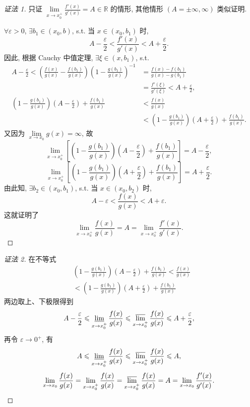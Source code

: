 \begin{proof}[证法 1]
只证 $\lim\limits_{x\to x_0^{+}}\frac{f'(x)}{g'(x)}=A\in\mathbb{R}$ 的情形, 其他情形 $(A=\pm\infty,\infty)$ 类似证明.

$\forall\varepsilon>0$, $\exists b_1\in(x_0,b)$, s.t. 当 $x\in(x_0,b_1)$ 时,
\[
A-\frac{\varepsilon}{2}<\frac{f'(x)}{g'(x)}<A+\frac{\varepsilon}{2}.
\]
因此, 根据 Cauchy 中值定理, $\exists\xi\in(x,b_1)$, s.t.
\[
\begin{aligned}
A-\frac{\varepsilon}{2}<\left(\frac{f(x)}{g(x)}-\frac{f(b_1)}{g(x)}\right)\left(1-\frac{g(b_1)}{g(x)}\right)^{-1}&=\frac{f(x)-f(b_1)}{g(x)-g(b_1)}\\
&=\frac{f'(\xi)}{g'(\xi)}<A+\frac{\varepsilon}{2},\\
\left(1-\frac{g(b_1)}{g(x)}\right)\left(A-\frac{\varepsilon}{2}\right)+\frac{f(b_1)}{g(x)}&<\frac{f(x)}{g(x)}\\
&<\left(1-\frac{g(b_1)}{g(x)}\right)\left(A+\frac{\varepsilon}{2}\right)+\frac{f(b_1)}{g(x)}.
\end{aligned}
\]
又因为 $\lim\limits_{x\to x_0}g(x)=\infty$, 故
\[
\lim_{x\to x_0^{+}}\left[\left(1-\frac{g(b_1)}{g(x)}\right)\left(A-\frac{\varepsilon}{2}\right)+\frac{f(b_1)}{g(x)}\right]=A-\frac{\varepsilon}{2},
\]
\[
\lim_{x\to x_0^{+}}\left[\left(1-\frac{g(b_1)}{g(x)}\right)\left(A+\frac{\varepsilon}{2}\right)+\frac{f(b_1)}{g(x)}\right]=A+\frac{\varepsilon}{2}.
\]
由此知, $\exists b_2\in(x_0,b_1)$, s.t. 当 $x\in(x_0,b_2)$ 时,
\[
A-\varepsilon<\frac{f(x)}{g(x)}<A+\varepsilon.
\]
这就证明了
\[
\lim_{x\to x_0^{+}}\frac{f(x)}{g(x)}=A=\lim_{x\to x_0^{+}}\frac{f'(x)}{g'(x)}.
\]
\end{proof}

\begin{proof}[证法 2]
在不等式
\[
\begin{aligned}
&\left(1-\frac{g(b_1)}{g(x)}\right)\left(A-\frac{\varepsilon}{2}\right)+\frac{f(b_1)}{g(x)}<\frac{f(x)}{g(x)}\\
&<\left(1-\frac{g(b_1)}{g(x)}\right)\left(A+\frac{\varepsilon}{2}\right)+\frac{f(b_1)}{g(x)}
\end{aligned}
\]
两边取上、下极限得到
\[
A-\frac{\varepsilon}{2}\leqslant\varliminf_{x\to x_0^{+}}\frac{f(x)}{g(x)}\leqslant\varlimsup_{x\to x_0^{+}}\frac{f(x)}{g(x)}\leqslant A+\frac{\varepsilon}{2},
\]
再令 $\varepsilon\to0^{+}$, 有
\[
A\leqslant\varliminf_{x\to x_0^{+}}\frac{f(x)}{g(x)}\leqslant\varlimsup_{x\to x_0^{+}}\frac{f(x)}{g(x)}\leqslant A,
\]
\[
\lim_{x\to x_0}\frac{f(x)}{g(x)}=\lim_{x\to x_0^{+}}\frac{f(x)}{g(x)}=\varlimsup_{x\to x_0^{+}}\frac{f(x)}{g(x)}=A=\lim_{x\to x_0}\frac{f'(x)}{g'(x)}.
\]
\end{proof}

